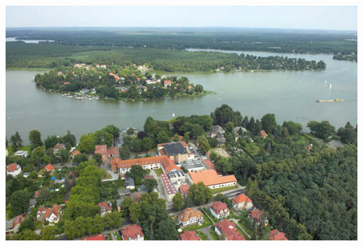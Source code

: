 \documentclass[10pt,t]{beamer}
\begin{document}
\begin{frame}
\begin{columns}[c]
    \includegraphics[width=\textwidth]{zeuthen}
\end{columns}
\end{frame}
\end{document}
